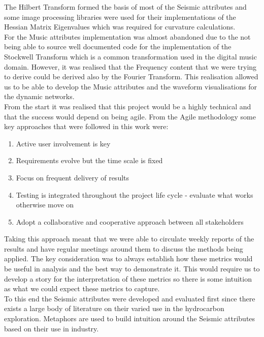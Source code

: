 The Hilbert Transform formed the basis of most of the Seismic attributes and some image processing libraries were used for their implementations of the Hessian Matrix Eigenvalues which was required for curvature calculations. \\

For the Music attributes implementation was almost abandoned due to the not being able to source well documented code for the implementation of the Stockwell Transform which is a common transformation used in the digital music domain. However, it was realised that the Frequency content that we were trying to derive could be derived also by the Fourier Transform. This realisation allowed us to be able to develop the Music attributes and the waveform visualisations for the dynamic networks. \\

From the start it was realised that this project would be a highly technical and that the success would depend on being agile. From the Agile methodology some key approaches that were followed in this work were:

\begin{enumerate}
    \item Active user involvement is key
    \item Requirements evolve but the time scale is fixed
    \item Focus on frequent delivery of results
    \item Testing is integrated throughout the project life cycle - evaluate what works otherwise move on
    \item Adopt a collaborative and cooperative approach between all stakeholders
\end{enumerate}

Taking this approach meant that we were able to circulate weekly reports of the results and have regular meetings around them to discuss the methods being applied. The key consideration was to always establish how these metrics would be useful in analysis and the best way to demonstrate it. This would require us to develop a story for the interpretation of these metrics so there is some intuition as what we could expect these metrics to capture. \\

To this end the Seismic attributes were developed and evaluated first since there exists a large body of literature on their varied use in the hydrocarbon exploration. Metaphors are used to build intuition around the Seismic attributes based on their use in industry. \\

